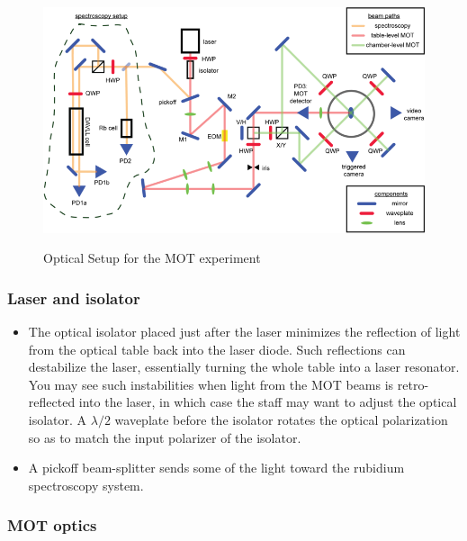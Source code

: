 \documentclass{../lab}
\begin{document}
\begin{figure}[h]
    \centering
    \href{http://experimentationlab.berkeley.edu/sites/default/files/images/800px-Setupv7.png}{\includegraphics[width=0.8\linewidth]{images/800px-Setupv7.png}}
    \caption{Optical Setup for the MOT experiment}
    \label{fig:OpticalSetup}
\end{figure}

\subsubsection{Laser and isolator}

\begin{itemize}
    \item The optical isolator placed just after the laser minimizes the reflection of light from the optical table back into the laser diode.  Such reflections can destabilize the laser, essentially turning the whole table into a laser resonator. You may see such instabilities when light from the MOT beams is retro-reflected into the laser, in which case the staff may want to adjust the optical isolator. A $\lambda/2$ waveplate before the isolator rotates the optical polarization so as to match the input polarizer of the isolator.

    \item A pickoff beam-splitter sends some of the light toward the rubidium spectroscopy system.
\end{itemize}

\subsubsection{MOT optics}
\end{document}
